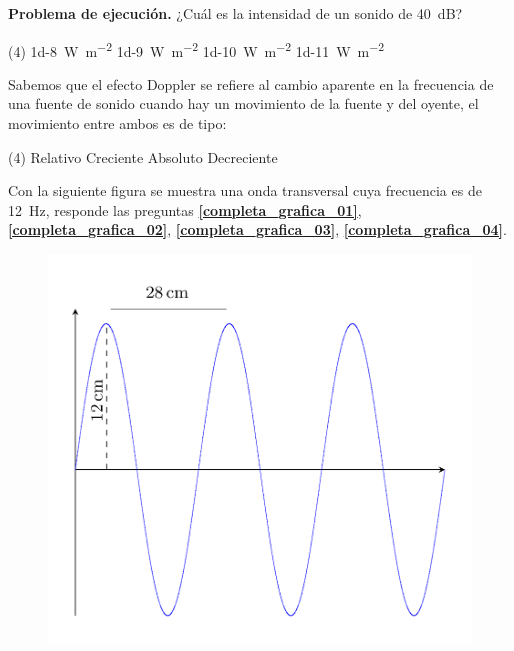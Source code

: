 \documentclass[12pt, letter]{exam}
\begin{document}
\begin{questions}
\begin{tasks}
    \end{tasks}
    \question \textbf{Problema de ejecución.} ¿Cuál es la intensidad de un sonido de \SI{40}{\dB}?
    \begin{tasks}(4)
        \task \SI{1d-8}{\watt\per\square\meter}
        \task \SI{1d-9}{\watt\per\square\meter}
        \task \SI{1d-10}{\watt\per\square\meter}
        \task \SI{1d-11}{\watt\per\square\meter}
    \end{tasks}
    \question Sabemos que el efecto Doppler se refiere al cambio aparente en la frecuencia de una fuente
    de sonido cuando hay un movimiento de la fuente y del oyente, el movimiento entre ambos es de tipo:
    \begin{tasks}(4)
        \task Relativo
        \task Creciente
        \task Absoluto
        \task Decreciente
    \end{tasks}
    Con la siguiente figura se muestra una onda transversal cuya frecuencia es de \SI{12}{\hertz}, responde las preguntas \textbf{\ref{completa_grafica_01}}, \textbf{\ref{completa_grafica_02}}, \textbf{\ref{completa_grafica_03}}, \textbf{\ref{completa_grafica_04}}.
    \begin{figure}[H]
        \centering
        \includegraphics[scale=0.3]{Imagenes/Grafica_Onda_Examen_01.png}

\end{figure}
\end{questions}
\end{document}
